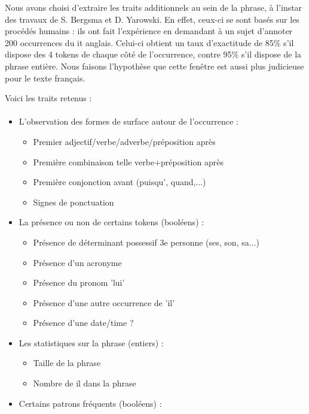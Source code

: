 \documentclass[a4paper,12pt]{article}
\begin{document}
Nous avons choisi d'extraire les traits additionnels au sein de la phrase, à l'instar des travaux de S. Bergsma et D. Yarowski. En effet, ceux-ci se sont basés sur les procédés humains : ils ont fait l'expérience en demandant à un sujet d'annoter 200 occurrences du \og{}it\fg{} anglais. Celui-ci obtient un taux d'exactitude de 85\% s'il dispose des 4 tokens de chaque côté de l'occurrence, contre 95\% s'il dispose de la phrase entière. Nous faisons l'hypothèse que cette fenêtre est aussi plus judicieuse pour le texte français.

Voici les traits retenus :

\paragraph{}
\begin{itemize}
 \item[\textbullet] L'observation des formes de surface autour de l’occurrence :
 \begin{itemize}
  \item Premier adjectif/verbe/adverbe/préposition après
  \item Première combinaison telle verbe+préposition après
  \item Première conjonction avant (puisqu', quand,...)
  \item Signes de ponctuation
 \end{itemize}
 \item[\textbullet] La présence ou non de certains tokens (booléens) :
 \begin{itemize}
  \item Présence de déterminant possessif 3e personne (ses, son, sa...)
  \item Présence d'un acronyme
  \item Présence du pronom 'lui'
  \item Présence d'une autre occurrence de 'il'
  \item Présence d'une date/time ?
 \end{itemize}
 \item[\textbullet] Les statistiques sur la phrase (entiers) :
 \begin{itemize}
  \item Taille de la phrase
  \item Nombre de \og{}il\fg{} dans la phrase
 \end{itemize}
 \item[\textbullet] Certains patrons fréquents (booléens) :
 \begin{itemize}

\end{itemize}
\end{itemize}
\end{document}
